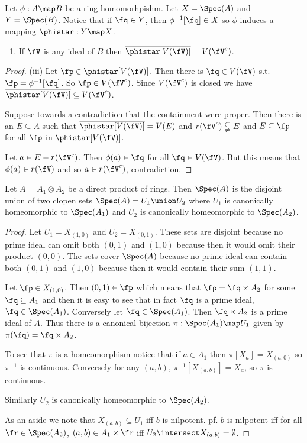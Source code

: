 \documentclass[oneside,12pt]{amsart}
\begin{document}
\begin{exercise}[exercise 21]Let $\phi:A\map B$ be a ring homomorhpishm. Let $X=\Spec(A)$
and $Y=\Spec(B)$. Notice that if $\fq\in Y$, then $\phi^{-1}[\fq]\in X$ so $\phi$ induces a mapping
$\phistar:Y\map X$.
\begin{enumerate}
\item[(iii)] If $\fV$ is any ideal of $B$ then $\overline{\phistar[V(\fV)]} = V(\fV^c)$.
\end{enumerate}
\end{exercise}
\begin{proof}
(iii) Let $\fp\in \phistar[V(\fV)]$. Then there is $\fq\in V(\fV)$ s.t.
$\fp=\phi^{-1}[\fq]$. So $\fp\in V(\fV^c)$. Since $V(\fV^c)$ is closed we have
$\overline{\phistar[V(\fV)]} \subseteq V(\fV^c)$.

Suppose towards a contradiction that the containment were proper.
Then there is an $E\subseteq A$
such that $\overline{\phistar[V(\fV)]} = V(E)$ and $r(\fV^c) \subsetneqq E$
and $E\subseteq\fp$ for all $\fp$ in $\phistar[V(\fV)]$.

Let $a\in E - r(\fV^c)$. Then $\phi(a)\in\fq$ for all $\fq\in V(\fV)$. But this means that
$\phi(a)\in r(\fV)$ and so $a\in r(\fV^c)$, contradiction.
\end{proof}

\begin{exercise}[exercise 22] Let $A = A_1 \otimes A_2$ be a direct product of rings.
Then $\Spec(A)$ is the disjoint union of two clopen sets $\Spec(A) = U_1 \union U_2$
where $U_1$ is canonically homeomorphic to $\Spec(A_1)$ and $U_2$ is canonically
homeomorphic to $\Spec(A_2)$.
\end{exercise}
\begin{proof}
Let $U_1=X_{(1,0)}$ and $U_2=X_{(0, 1)}$. These sets are disjoint because no prime ideal
can omit both $(0, 1)$ and $(1,0)$ because then it would omit their product $(0, 0)$.
The sets cover $\Spec(A)$ because no prime ideal can contain both $(0, 1)$ and
$(1, 0)$ because then it would contain their sum $(1, 1)$.

Let $\fp\in X_{(1, 0)}$.
Then $(0, 1) \in \fp$ which means that $\fp = \fq \times A_2$ for some $\fq \subseteq A_1$ and then
it is easy to see that in fact $\fq$ is a prime ideal, $\fq \in \Spec(A_1)$.
Conversely let $\fq \in \Spec(A_1)$. Then $\fq \times A_2$ is a prime ideal of $A$.
Thus there is a canonical bijection $\pi:\Spec(A_1) \map U_1$ given by
$\pi(\fq) = \fq \times A_2$.

To see that $\pi$ is a homeomorphism notice that if $a\in A_1$ then $\pi[X_a]=X_{(a, 0)}$ so
$\pi^{-1}$ is continuous. Conversely for any $(a, b)$, $\pi^{-1}[X_{(a,b)}] = X_a$, so $\pi$  is continuous.

Similarly $U_2$ is canonically homeomorphic to $\Spec(A_2)$.

As an aside we note that $X_{(a, b)} \subseteq U_1$ iff $b$ is nilpotent. pf. $b$ is nilpotent iff
for all $\fr\in\Spec(A_2)$, $(a,b)\in A_1 \times \fr$ iff $U_2 \intersect X_{(a,b)}=\emptyset$.
\end{proof}
\end{document}
